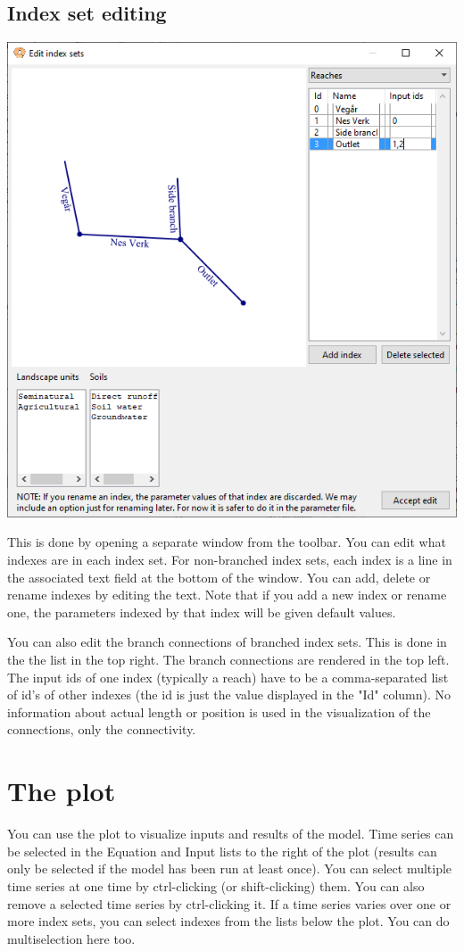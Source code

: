 \documentclass[11pt]{article}
\theoremstyle{definition}
\begin{document}
\subsection{Index set editing}\label{sec:editindexes}

\begin{center}
\includegraphics[width=0.7\linewidth]{img/editindexes}
\end{center}

This is done by opening a separate window from the toolbar. You can edit what indexes are in each index set. For non-branched index sets, each index is a line in the associated text field at the bottom of the window. You can add, delete or rename indexes by editing the text. Note that if you add a new index or rename one, the parameters indexed by that index will be given default values.

You can also edit the branch connections of branched index sets. This is done in the the list in the top right. The branch connections are rendered in the top left. The input ids of one index (typically a reach) have to be a comma-separated list of id's of other indexes (the id is just the value displayed in the "Id" column). No information about actual length or position is used in the visualization of the connections, only the connectivity.

\section{The plot} \label{sec:plotting}

You can use the plot to visualize inputs and results of the model. Time series can be selected in the Equation and Input lists to the right of the plot (results can only be selected if the model has been run at least once). You can select multiple time series at one time by ctrl-clicking (or shift-clicking) them. You can also remove a selected time series by ctrl-clicking it. If a time series varies over one or more index sets, you can select indexes from the lists below the plot. You can do multiselection here too.
\end{document}
